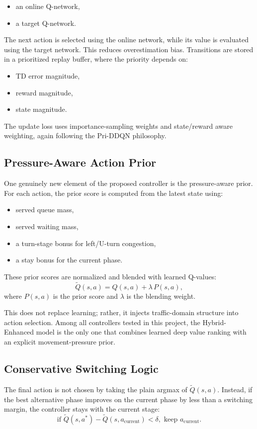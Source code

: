 \documentclass[conference]{IEEEtran}
\begin{document}
\begin{itemize}
\item an online Q-network,
\item a target Q-network.
\end{itemize}

The next action is selected using the online network, while its value
is evaluated using the target network. This reduces overestimation
bias. Transitions are stored in a prioritized replay buffer, where
the priority depends on:

\begin{itemize}
\item TD error magnitude,
\item reward magnitude,
\item state magnitude.
\end{itemize}

The update loss uses importance-sampling weights and state/reward
aware weighting, again following the Pri-DDQN philosophy.

\subsection{Pressure-Aware Action Prior}
One genuinely new element of the proposed controller is the
pressure-aware prior. For each action, the prior score is computed
from the latest state using:

\begin{itemize}
\item served queue mass,
\item served waiting mass,
\item a turn-stage bonus for left/U-turn congestion,
\item a stay bonus for the current phase.
\end{itemize}

These prior scores are normalized and blended with learned Q-values:
\begin{equation}
\tilde{Q}(s,a) = Q(s,a) + \lambda \, P(s,a),
\end{equation}
where $P(s,a)$ is the prior score and $\lambda$ is the blending
weight.

This does not replace learning; rather, it injects traffic-domain
structure into action selection. Among all controllers tested in this
project, the Hybrid-Enhanced model is the only one that combines
learned deep value ranking with an explicit movement-pressure prior.

\subsection{Conservative Switching Logic}
The final action is not chosen by taking the plain argmax of
$\tilde{Q}(s,a)$. Instead, if the best alternative phase improves on
the current phase by less than a switching margin, the controller
stays with the current stage:
\begin{equation}
\text{if } \tilde{Q}(s,a^*) - \tilde{Q}(s,a_{\text{current}}) < \delta,
\text{ keep } a_{\text{current}}.
\end{equation}
\end{document}
